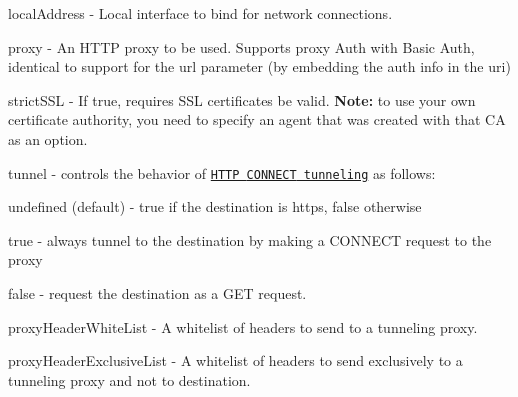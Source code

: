 \begin{DoxyItemize}
\item {\ttfamily local\+Address} -\/ Local interface to bind for network connections.
\item {\ttfamily proxy} -\/ An H\+T\+TP proxy to be used. Supports proxy Auth with Basic Auth, identical to support for the {\ttfamily url} parameter (by embedding the auth info in the {\ttfamily uri})
\item {\ttfamily strict\+S\+SL} -\/ If {\ttfamily true}, requires S\+SL certificates be valid. {\bfseries Note\+:} to use your own certificate authority, you need to specify an agent that was created with that CA as an option.
\item {\ttfamily tunnel} -\/ controls the behavior of \href{https://en.wikipedia.org/wiki/HTTP_tunnel#HTTP_CONNECT_tunneling}{\tt H\+T\+TP {\ttfamily C\+O\+N\+N\+E\+CT} tunneling} as follows\+:
\begin{DoxyItemize}
\item {\ttfamily undefined} (default) -\/ {\ttfamily true} if the destination is {\ttfamily https}, {\ttfamily false} otherwise
\item {\ttfamily true} -\/ always tunnel to the destination by making a {\ttfamily C\+O\+N\+N\+E\+CT} request to the proxy
\item {\ttfamily false} -\/ request the destination as a {\ttfamily G\+ET} request.
\end{DoxyItemize}
\item {\ttfamily proxy\+Header\+White\+List} -\/ A whitelist of headers to send to a tunneling proxy.
\item {\ttfamily proxy\+Header\+Exclusive\+List} -\/ A whitelist of headers to send exclusively to a tunneling proxy and not to destination. 



\end{DoxyItemize}
